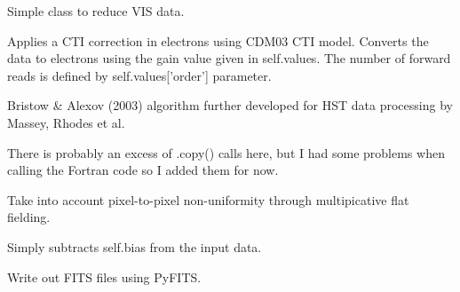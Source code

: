 \documentclass[a4paper,12pt,english]{sphinxmanual}
\begin{document}
\begin{fulllineitems}
\label{reduction:reduction.reduceVISdata.reduceVISdata}
Simple class to reduce VIS data.

\begin{fulllineitems}
\label{reduction:reduction.reduceVISdata.reduceVISdata.applyCTICorrection}
Applies a CTI correction in electrons using CDM03 CTI model.
Converts the data to electrons using the gain value given in self.values.
The number of forward reads is defined by self.values{[}'order'{]} parameter.

Bristow \& Alexov (2003) algorithm further developed for HST data
processing by Massey, Rhodes et al.

There is probably an excess of .copy() calls here, but I had some problems
when calling the Fortran code so I added them for now.

\end{fulllineitems}


\begin{fulllineitems}
\label{reduction:reduction.reduceVISdata.reduceVISdata.flatfield}
Take into account pixel-to-pixel non-uniformity through multipicative flat fielding.

\end{fulllineitems}


\begin{fulllineitems}
\label{reduction:reduction.reduceVISdata.reduceVISdata.subtractBias}
Simply subtracts self.bias from the input data.

\end{fulllineitems}


\begin{fulllineitems}
\label{reduction:reduction.reduceVISdata.reduceVISdata.writeFITSfile}
Write out FITS files using PyFITS.

\end{fulllineitems}


\end{fulllineitems}
\end{document}
